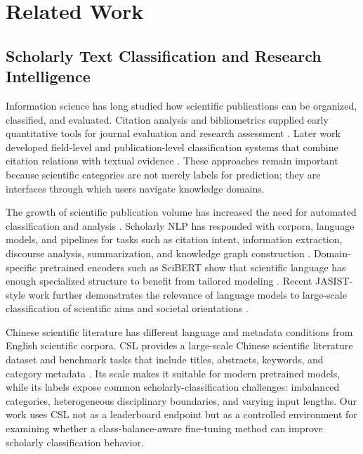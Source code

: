 \documentclass[10pt]{article}
\begin{document}
\section{Related Work}

\subsection{Scholarly Text Classification and Research Intelligence}

Information science has long studied how scientific publications can be organized, classified, and evaluated. Citation analysis and bibliometrics supplied early quantitative tools for journal evaluation and research assessment \citep{garfield1972citation,narin1976evaluative}. Later work developed field-level and publication-level classification systems that combine citation relations with textual evidence \citep{waltman2012new,boyack2014characterizing}. These approaches remain important because scientific categories are not merely labels for prediction; they are interfaces through which users navigate knowledge domains.

The growth of scientific publication volume has increased the need for automated classification and analysis \citep{bornmann2015growth,fortunato2018science}. Scholarly NLP has responded with corpora, language models, and pipelines for tasks such as citation intent, information extraction, discourse analysis, summarization, and knowledge graph construction \citep{cohan2018discourse,ammar2018construction,luan2018multi,lo2020s2orc}. Domain-specific pretrained encoders such as SciBERT show that scientific language has enough specialized structure to benefit from tailored modeling \citep{beltagy2019scibert}. Recent JASIST-style work further demonstrates the relevance of language models to large-scale classification of scientific aims and societal orientations \citep{wu2025scaling}.

Chinese scientific literature has different language and metadata conditions from English scientific corpora. CSL provides a large-scale Chinese scientific literature dataset and benchmark tasks that include titles, abstracts, keywords, and category metadata \citep{li-etal-2022-csl}. Its scale makes it suitable for modern pretrained models, while its labels expose common scholarly-classification challenges: imbalanced categories, heterogeneous disciplinary boundaries, and varying input lengths. Our work uses CSL not as a leaderboard endpoint but as a controlled environment for examining whether a class-balance-aware fine-tuning method can improve scholarly classification behavior.
\end{document}
